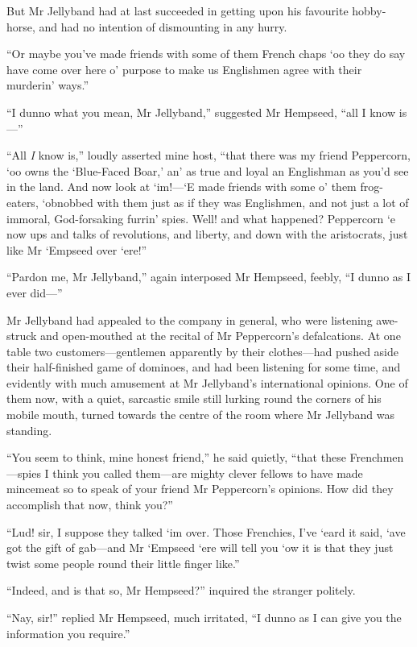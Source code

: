 But Mr Jellyband had at last succeeded in getting upon his favourite hobby-horse, and had no intention of dismounting in any hurry.

\enquote{Or maybe you've made friends with some of them French chaps `oo they do say have come over here o’ purpose to make us Englishmen agree with their murderin’ ways.}

\enquote{I dunno what you mean, Mr Jellyband,} suggested Mr Hempseed, \enquote{all I know is---}

\enquote{All \textit{I} know is,} loudly asserted mine host, \enquote{that there was my friend Peppercorn, `oo owns the \enquote{Blue-Faced Boar,} an’ as true and loyal an Englishman as you'd see in the land. And now look at `im!---`E made friends with some o’ them frog-eaters, `obnobbed with them just as if they was Englishmen, and not just a lot of immoral, God-forsaking furrin’ spies. Well! and what happened? Peppercorn `e now ups and talks of revolutions, and liberty, and down with the aristocrats, just like Mr `Empseed over `ere!}

\enquote{Pardon me, Mr Jellyband,} again interposed Mr Hempseed, feebly, \enquote{I dunno as I ever did---}

Mr Jellyband had appealed to the company in general, who were listening awe-struck and open-mouthed at the recital of Mr Peppercorn's defalcations. At one table two customers---gentlemen apparently by their clothes---had pushed aside their half-finished game of dominoes, and had been listening for some time, and evidently with much amusement at Mr Jellyband's international opinions. One of them now, with a quiet, sarcastic smile still lurking round the corners of his mobile mouth, turned towards the centre of the room where Mr Jellyband was standing.

\enquote{You seem to think, mine honest friend,} he said quietly, \enquote{that these Frenchmen---spies I think you called them---are mighty clever fellows to have made mincemeat so to speak of your friend Mr Peppercorn's opinions. How did they accomplish that now, think you?}

\enquote{Lud! sir, I suppose they talked `im over. Those Frenchies, I've `eard it said, `ave got the gift of gab---and Mr `Empseed `ere will tell you `ow it is that they just twist some people round their little finger like.}

\enquote{Indeed, and is that so, Mr Hempseed?} inquired the stranger politely.

\enquote{Nay, sir!} replied Mr Hempseed, much irritated, \enquote{I dunno as I can give you the information you require.}

